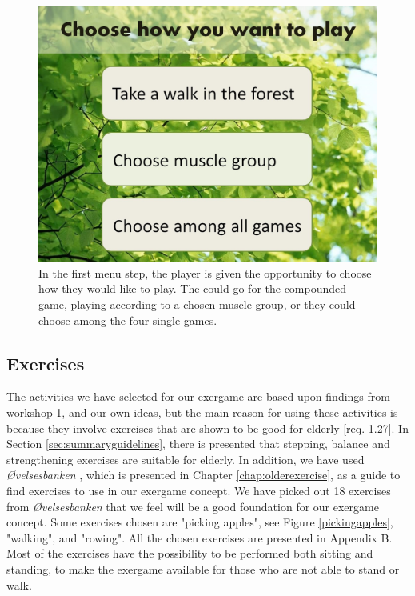 \begin{figure} [H]
\centering
\includegraphics[scale=0.45]{choosePlay.jpg}
\caption[The menu - start]{In the first menu step, the player is given the opportunity to choose how they would like to play. The could go for the compounded game, playing according to a chosen muscle group, or they could choose among the four single games.}
\label{fig:menuStart}
\end{figure} 

\subsection{Exercises}
The activities we have selected for our exergame are based upon findings from workshop 1, and our own ideas, but the main reason for using these activities is because they involve exercises that are shown to be good for elderly [req. 1.27]. In Section \ref{sec:summaryguidelines}, there is presented that stepping, balance and strengthening exercises are suitable for elderly. In addition, we have used \emph{Øvelsesbanken} \cite{eldretrening}, which is presented in Chapter \ref{chap:olderexercise}, as a guide to find exercises to use in our exergame concept. We have picked out 18 exercises from \emph{Øvelsesbanken} that we feel will be a good foundation for our exergame concept. Some exercises chosen are "picking apples", see Figure \ref{pickingapples}, "walking", and "rowing". All the chosen exercises are presented in Appendix B. Most of the exercises have the possibility to be performed both sitting and standing, to make the exergame available for those who are not able to stand or walk.


